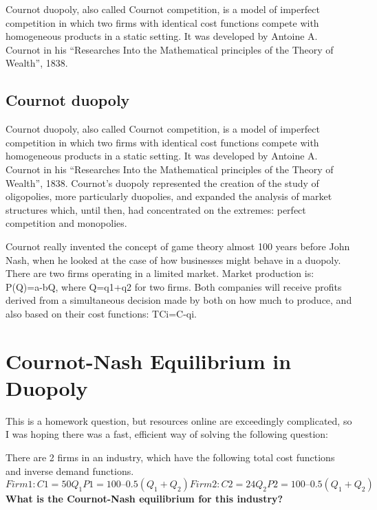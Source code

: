 \documentclass[]{report}
\begin{document}
Cournot duopoly, also called Cournot competition, is a model of imperfect competition in which two firms with identical cost functions compete with homogeneous products in a static setting. It was developed by Antoine A. Cournot in his “Researches Into the Mathematical principles of the Theory of Wealth”, 1838.

\subsection{Cournot duopoly}
Cournot duopoly, also called Cournot competition, is a model of imperfect competition in which two firms with identical cost functions compete with homogeneous products in a static setting. It was developed by Antoine A. Cournot in his “Researches Into the Mathematical principles of the Theory of Wealth”, 1838. Cournot’s duopoly represented the creation of the study of oligopolies, more particularly duopolies, and expanded the analysis of market structures which, until then, had concentrated on the extremes: perfect competition and monopolies.

Cournot really invented the concept of game theory almost 100 years before John Nash, when he looked at the case of how businesses might behave in a duopoly. There are two firms operating in a limited market. Market production is: P(Q)=a-bQ, where Q=q1+q2 for two firms. Both companies will receive profits derived from a simultaneous decision made by both on how much to produce, and also based on their cost functions: TCi=C-qi.

\newpage
\section{Cournot-Nash Equilibrium in Duopoly}

This is a homework question, but resources online are exceedingly complicated, so I was hoping there was a fast, efficient way of solving the following question:

There are 2 firms in an industry, which have the following total cost functions and inverse demand functions.
\[Firm 1:C1=50Q_1P1=100–0.5(Q_1+Q_2)Firm 2:C2=24Q_2P2=100–0.5(Q_1+Q_2)\]
\textbf{What is the Cournot-Nash equilibrium for this industry?}
\end{document}
